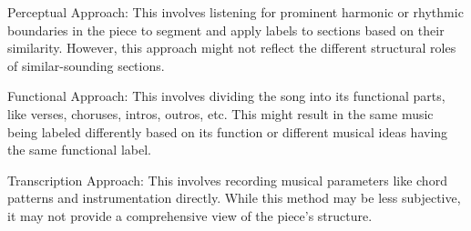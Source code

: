 Perceptual Approach: This involves listening for prominent harmonic or rhythmic boundaries in the piece to segment and apply labels to sections based on their similarity. However, this approach might not reflect the different structural roles of similar-sounding sections.

Functional Approach: This involves dividing the song into its functional parts, like verses, choruses, intros, outros, etc. This might result in the same music being labeled differently based on its function or different musical ideas having the same functional label.

Transcription Approach: This involves recording musical parameters like chord patterns and instrumentation directly. While this method may be less subjective, it may not provide a comprehensive view of the piece's structure.
